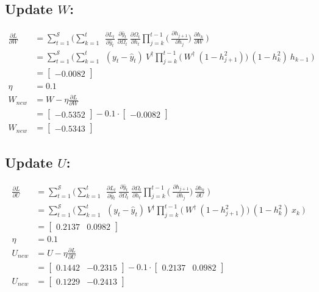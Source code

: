 \documentclass{article}
\begin{document}
\subsection{Update $W$:}
\begin{align*}
    \frac{\partial L}{ \partial{W}} &= \sum_{t=1}^{\mathcal{S}} 
	\bigg(	
	 \sum_{k=1}^{t} ~
	~\frac{\partial L_t}{\partial \hat{y}_t}
        ~\frac{\partial \hat{y}_t}{\partial \Omega_t}
	~\frac{\partial \Omega_t}{\partial h_t}
        \prod_{j=k}^{t-1} \bigg(
	~\frac{\partial h_{j+1}}{\partial h_{j}}
        \bigg)
	~\frac{\partial h_k}{\partial W}~
	\bigg) \\
  &= \sum_{t=1}^{\mathcal{S}} 
	\bigg(	
	 \sum_{k=1}^{t} ~
	~(y_t - \hat{y}_t)
	~V^\dagger
        \prod_{j=k}^{t-1} \bigg(
	~W^\dagger ~ (1 - h_{j+1}^2)
        \bigg)
	~(1-h_k^2)~ h_{k-1}~
	\bigg) \\
 &= \begin{bmatrix}
-0.0082
\end{bmatrix}\\
\eta &= 0.1\\
W_{new} &= W - \eta \frac{\partial L}{\partial W}\\
&= \begin{bmatrix}
    -0.5352
\end{bmatrix}- 0.1 \cdot \begin{bmatrix}
-0.0082
\end{bmatrix}\\
W_{new} &= \begin{bmatrix}
-0.5343
\end{bmatrix}
\end{align*}
\subsection{Update $U$:}
\begin{align*}
\frac{\partial L}{ \partial{U}} &= \sum_{t=1}^{\mathcal{S}} 
	\bigg(	
	 \sum_{k=1}^{t} ~
	~\frac{\partial L_t}{\partial \hat{y}_t}
        ~\frac{\partial \hat{y}_t}{\partial \Omega_t}
	~\frac{\partial \Omega_t}{\partial h_t}
        \prod_{j=k}^{t-1} \bigg(
	~\frac{\partial h_{j+1}}{\partial h_{j}}
        \bigg)
	~\frac{\partial h_k}{\partial U}~
	\bigg) \\
  &= \sum_{t=1}^{\mathcal{S}} 
	\bigg(	
	 \sum_{k=1}^{t} ~
	~(y_t - \hat{y}_t)
	~V^\dagger
        \prod_{j=k}^{t-1} \bigg(
	~W^\dagger ~ (1 - h_{j+1}^2)
        \bigg)
	~(1-h_k^2)~ x_{k}~
	\bigg) \\
    &= \begin{bmatrix}
0.2137 & 0.0982
\end{bmatrix}\\
\eta &= 0.1\\
U_{new} &= U - \eta \frac{\partial L}{\partial U}\\
&=\begin{bmatrix}
    0.1442 & -0.2315
\end{bmatrix} - 0.1 \cdot \begin{bmatrix}
0.2137 & 0.0982
\end{bmatrix}\\
U_{new} &= \begin{bmatrix}
0.1229 & -0.2413
\end{bmatrix}
\end{align*}
\end{document}
